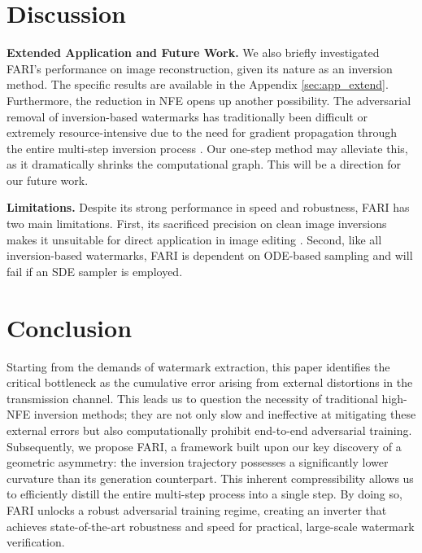 \documentclass{article}
\begin{document}
\section{Discussion}
\label{sec:discuss}

\textbf{Extended Application and Future Work.}
We also briefly investigated FARI's performance on image reconstruction, given its nature as an inversion method. The specific results are available in the Appendix \ref{sec:app_extend}. Furthermore, the reduction in NFE opens up another possibility. The adversarial removal of inversion-based watermarks has traditionally been difficult or extremely resource-intensive due to the need for gradient propagation through the entire multi-step inversion process \citep{forgery2024}. Our one-step method may alleviate this, as it dramatically shrinks the computational graph. This will be a direction for our future work.

\textbf{Limitations.}
Despite its strong performance in speed and robustness, FARI has two main limitations. First, its sacrificed precision on clean image inversions makes it unsuitable for direct application in image editing \citep{ptp2022}. Second, like all inversion-based watermarks, FARI is dependent on ODE-based sampling \citep{ddim_2021,dpm_2022} and will fail if an SDE sampler \citep{ddpm_2020,sde2020} is employed.


\section{Conclusion}
\label{sec:conclusion}

Starting from the demands of watermark extraction, this paper identifies the critical bottleneck as the cumulative error arising from external distortions in the transmission channel. This leads us to question the necessity of traditional high-NFE inversion methods; they are not only slow and ineffective at mitigating these external errors but also computationally prohibit end-to-end adversarial training. Subsequently, we propose FARI, a framework built upon our key discovery of a geometric asymmetry: the inversion trajectory possesses a significantly lower curvature than its generation counterpart. This inherent compressibility allows us to efficiently distill the entire multi-step process into a single step. By doing so, FARI unlocks a robust adversarial training regime, creating an inverter that achieves state-of-the-art robustness and speed for practical, large-scale watermark verification.
\end{document}
